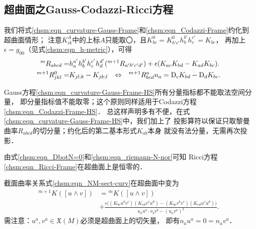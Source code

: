 \subsection{超曲面之Gauss-Codazzi-Ricci方程}
我们将式\eqref{chsm:eqn_curvature-Gauss-Frame}和\eqref{chsm:eqn_Codazzi-Frame}约化到超曲面情形；
注意$K^A_{ik}$中的上标$A$只能取〇，且$K^0_{bc}=K^0_{b'c'} h_b^{b'} h_c^{c'} = K_{bc}$，
再加上$\epsilon=g_{00}$（见式\eqref{chsm:eqn_h-metric}），可得
\begin{align}
    {}^{m}{R}_{abcd} =& %
    h_a^{a'}h_b^{b'}h_c^{c'}h_d^{d'} ({}^{m+1}{R}_{a' b' c' d' })
     +\epsilon (K_{ac}K_{bd} - K_{ad} K_{bc} ).
    \label{chsm:eqn_curvature-Gauss-Frame-HS} \\
    {}^{m+1}{R}^0_{jkl} =& K_{jl;k} -K_{jk;l} {\quad \Leftrightarrow \quad  }
    {}^{m+1}{R}^a_{bcd}{n}_a = {\rm D}_c K_{bd}- {\rm D}_d K_{bc} .
    \label{chsm:eqn_Codazzi-Frame-HS}
\end{align}



Gauss方程\eqref{chsm:eqn_curvature-Gauss-Frame-HS}所有分量指标都不能取法空间分量，
即分量指标值不能取零；这个原则同样适用于Codazzi方程\eqref{chsm:eqn_Codazzi-Frame-HS}．
总这样声明多有不便，在式\eqref{chsm:eqn_curvature-Gauss-Frame-HS}中，我们加上了
投影算符以保证只取黎曼曲率${R}_{abcd}$的切分量；约化后的第二基本形式$K_{ab}$本身
就没有法分量，无需再次投影．

由式\eqref{chsm:eqn_DbotN=0}和\eqref{chsm:eqn_riemann-N-nor}可知
Ricci方程\eqref{chsm:eqn_Ricci-Frame}在超曲面上是恒零的．

截面曲率关系式\eqref{chsm:eqn_NM-sect-curv}在超曲面中变为
\begin{equation}   \label{chsm:eqn_SigmaM-sect-curv}
    \begin{aligned}
    {}^{m+1} K([u\wedge v]) &= {}^{m} K([u\wedge v]) \\ 
    &+ \frac{\epsilon \bigl( 
        (K_{bc} u^b v^c) (K_{ed} v^e u^d)
        -(K_{bc} v^b v^c) (K_{ed} u^e u^d) 
        \bigr)}
    {{u}_a{u}^a \cdot {v}_b{v}^b - ({u}_a{v}^a)^2 }  .
    \end{aligned}
\end{equation} %
需注意：$u^a,v^a\in \mathfrak{X}(M)$必须是超曲面上的切矢量，
即有$n_a u^a =0 = n_av^a$．



